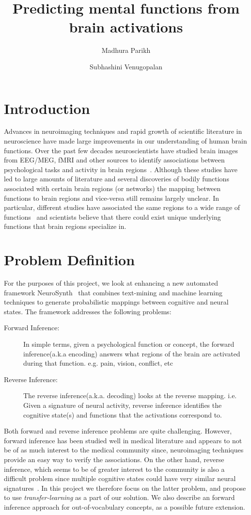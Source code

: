\documentclass[11pt]{article}
\title{\bf Predicting mental functions from brain activations}
\author{ Madhura Parikh \and Subhashini Venugopalan}
\begin{document}
\date{}
\maketitle

\section{Introduction}

Advances in neuroimaging techniques and rapid growth of scientific literature in neuroscience have made large improvements  in our understanding of human brain functions. 
Over the past few decades neuroscientists have studied brain images from EEG/MEG, fMRI and other sources to identify associations between psychological tasks and activity in brain regions~\cite{PMSKBY12}.
Although these studies have led to large amounts of literature and several discoveries of bodily functions associated with certain brain regions (or networks) the mapping between functions to brain regions and vice-versa still remains largely unclear. In particular, different studies have associated the same regions to a wide range of functions~\cite{PMSKBY12} and scientists believe that there could exist unique underlying functions that brain regions specialize in. 

\section{Problem Definition}
For the purposes of this project, we look at enhancing a new automated framework NeuroSynth~\cite{yarkoni2011large}  that combines text-mining and machine learning techniques to generate probabilistic mappings between cognitive and neural states. The framework addresses the following problems:
\begin{description}
\item[Forward Inference: ] In simple terms, given a psychological function or concept, the forward inference(a.k.a encoding) answers what regions of the brain are activated during that function. e.g. pain, vision, conflict, etc
\item[Reverse Inference: ] The reverse inference(a.k.a. decoding) looks at the reverse mapping. i.e. Given a signature of neural activity, reverse inference identifies the cognitive state(s) and functions that the activations correspond to.
\end{description}
Both forward and reverse inference problems are quite challenging. However, forward inference has been studied well in medical literature and appears to not be of as much interest to the medical community since, neuroimaging techniques provide an easy way to verify the associations. On the other hand, reverse inference, which seems to be of greater interest to the community is also a difficult problem since multiple cognitive states could have very similar neural signatures~\cite{yarkoni2011large}. In this project we therefore focus on the latter problem,  and propose to use \emph{transfer-learning} as a part of our solution.  We also describe an forward inference approach for out-of-vocabulary concepts, as a possible future extension.
\end{document}

